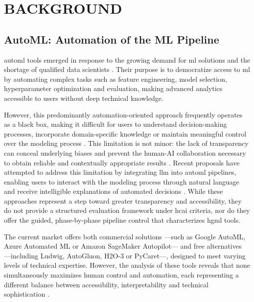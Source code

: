 \documentclass[a4paper,twoside]{article}
\begin{document}
\section{\uppercase{Background}}
\label{sec:background}

\subsection{AutoML: Automation of the ML Pipeline}

\Gls{automl} tools emerged in response to the growing demand for \gls{ml} solutions and the shortage of qualified data scientists \cite{he2021automl}. Their purpose is to democratize access to \gls{ml} by automating complex tasks such as feature engineering, model selection, hyperparameter optimization and evaluation, making advanced analytics accessible to users without deep technical knowledge.

However, this predominantly automation-oriented approach frequently operates as a black box, making it difficult for users to understand decision-making processes, incorporate domain-specific knowledge or maintain meaningful control over the modeling process \cite{garouani2023unlocking}. This limitation is not minor: the lack of transparency can conceal underlying biases and prevent the human-AI collaboration necessary to obtain reliable and contextually appropriate results \cite{komala2024fair}. Recent proposals have attempted to address this limitation by integrating \gls{llm} into \gls{automl} pipelines, enabling users to interact with the modeling process through natural language \cite{miguel2025integrating} and receive intelligible explanations of automated decisions \cite{francois2025interactive}. While these approaches represent a step toward greater transparency and accessibility, they do not provide a structured evaluation framework under \gls{hcai} criteria, nor do they offer the guided, phase-by-phase pipeline control that characterizes \gls{hgml} tools.

The current market offers both commercial solutions ---such as Google AutoML, Azure Automated ML or Amazon SageMaker Autopilot--- and free alternatives ---including Ludwig, AutoGluon, H2O-3 or PyCaret---, designed to meet varying levels of technical expertise. However, the analysis of these tools reveals that none simultaneously maximizes human control and automation, each representing a different balance between accessibility, interpretability and technical sophistication \cite{palazuelos2024non}.
\end{document}
